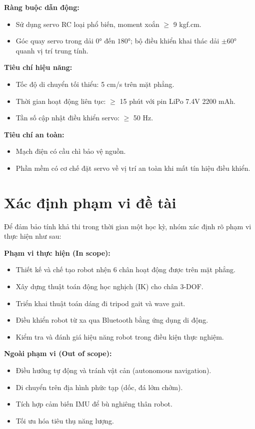         \textbf{Ràng buộc dẫn động:}
        \begin{itemize}
            \item Sử dụng servo RC loại phổ biến, moment xoắn $\geq$ 9 kgf.cm.
            \item Góc quay servo trong dải $0°$ đến $180°$; bộ điều khiển khai thác dải $\pm 60°$ quanh vị trí trung tính.
        \end{itemize}

        \textbf{Tiêu chí hiệu năng:}
        \begin{itemize}
            \item Tốc độ di chuyển tối thiểu: 5 cm/s trên mặt phẳng.
            \item Thời gian hoạt động liên tục: $\geq$ 15 phút với pin LiPo 7.4V 2200 mAh.
            \item Tần số cập nhật điều khiển servo: $\geq$ 50 Hz.
        \end{itemize}

        \textbf{Tiêu chí an toàn:}
        \begin{itemize}
            \item Mạch điện có cầu chì bảo vệ nguồn.
            \item Phần mềm có cơ chế đặt servo về vị trí an toàn khi mất tín hiệu điều khiển.
        \end{itemize}

        \section{Xác định phạm vi đề tài}

        \hspace{0.5cm} Để đảm bảo tính khả thi trong thời gian một học kỳ, nhóm xác định rõ phạm vi thực hiện như sau:

        \textbf{Phạm vi thực hiện (In scope):}
        \begin{itemize}
            \item Thiết kế và chế tạo robot nhện 6 chân hoạt động được trên mặt phẳng.
            \item Xây dựng thuật toán động học nghịch (IK) cho chân 3-DOF.
            \item Triển khai thuật toán dáng đi tripod gait và wave gait.
            \item Điều khiển robot từ xa qua Bluetooth bằng ứng dụng di động.
            \item Kiểm tra và đánh giá hiệu năng robot trong điều kiện thực nghiệm.
        \end{itemize}

        \textbf{Ngoài phạm vi (Out of scope):}
        \begin{itemize}
            \item Điều hướng tự động và tránh vật cản (autonomous navigation).
            \item Di chuyển trên địa hình phức tạp (dốc, đá lởm chởm).
            \item Tích hợp cảm biến IMU để bù nghiêng thân robot.
            \item Tối ưu hóa tiêu thụ năng lượng.
        \end{itemize}